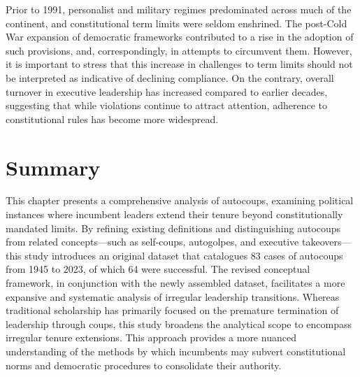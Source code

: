 \documentclass[
  12pt,
]{report}
\begin{document}
Prior to 1991, personalist and military regimes predominated across much
of the continent, and constitutional term limits were seldom enshrined.
The post-Cold War expansion of democratic frameworks contributed to a
rise in the adoption of such provisions, and, correspondingly, in
attempts to circumvent them. However, it is important to stress that
this increase in challenges to term limits should not be interpreted as
indicative of declining compliance. On the contrary, overall turnover in
executive leadership has increased compared to earlier decades,
suggesting that while violations continue to attract attention,
adherence to constitutional rules has become more widespread.

\section{Summary}\label{summary}

This chapter presents a comprehensive analysis of autocoups, examining
political instances where incumbent leaders extend their tenure beyond
constitutionally mandated limits. By refining existing definitions and
distinguishing autocoups from related concepts---such as self-coups,
autogolpes, and executive takeovers---this study introduces an original
dataset that catalogues 83 cases of autocoups from 1945 to 2023, of
which 64 were successful. The revised conceptual framework, in
conjunction with the newly assembled dataset, facilitates a more
expansive and systematic analysis of irregular leadership transitions.
Whereas traditional scholarship has primarily focused on the premature
termination of leadership through coups, this study broadens the
analytical scope to encompass irregular tenure extensions. This approach
provides a more nuanced understanding of the methods by which incumbents
may subvert constitutional norms and democratic procedures to
consolidate their authority.
\end{document}
